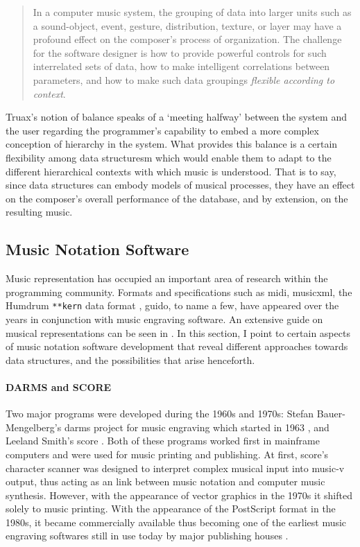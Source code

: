 	\begin{quote}
		In a computer music system, the grouping of data into larger units such as a sound-object, event, gesture, distribution, texture, or layer may have a profound effect on the composer's process of organization. The challenge for the software designer is how to provide powerful controls for such interrelated sets of data, how to make intelligent correlations between parameters, and how to make such data groupings \textit{flexible according to context}. \im \parencite[157]{Emm86:The}
	\end{quote}

	Truax's notion of balance speaks of a `meeting halfway' between the system and the user regarding the programmer's capability to embed a more complex conception of hierarchy in the system. What provides this balance is a certain flexibility among data structuresm which would enable them to adapt to the different hierarchical contexts with which music is understood. That is to say, since data structures can embody models of musical processes, they have an effect on the composer's overall performance of the database, and by extension, on the resulting music. 

\subsection{Music Notation Software}
\label{applications:notation}

Music representation has occupied an important area of research within the programming community. Formats and specifications such as \gls{midi}, \gls{musicxml}, the Humdrum \texttt{**kern} data format \parencite{DBLP:conf/ismir/Sapp05}, \gls{guido}, to name a few, have appeared over the years in conjunction with music engraving software. An extensive guide on musical representations can be seen in \textcite{Selfridge-Field:1997:BMH:275928}. In this section, I point to certain aspects of music notation software development that reveal different approaches towards data structures, and the possibilities that arise henceforth.

\paragraph{DARMS and SCORE}
Two major programs were developed during the 1960s and 1970s: Stefan Bauer-Mengelberg's \gls{darms} project for music engraving which started in 1963 \parencites{icmc/bbp2372.1983.002}{10.2307/30204239}, and Leeland Smith's  \gls{score} \parencite{smith1971}. Both of these programs worked first in mainframe computers and were used for music printing and publishing. At first, \gls{score}'s character scanner was designed to interpret complex musical input into \gls{music-v} output, thus acting as an link between music notation and computer music synthesis. However, with the appearance of vector graphics in the 1970s it shifted solely to music printing.  With the appearance of the PostScript format in the 1980s, it became commercially available thus becoming one of the earliest music engraving softwares still in use today by major publishing houses \parencite{scoremus}. 


